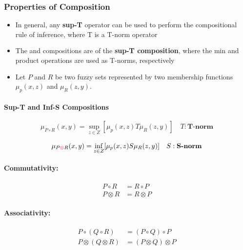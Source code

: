 \documentclass{tron}
\begin{document}
\subsubsection{Properties of Composition}
\begin{itemize}
	\item In general, any \textbf{sup-T} operator can be used to perform the compositional rule of inference, where T is a T-norm operator
	\item The  and  compositions are  of the \textbf{sup-T composition}, where the min and product operations are used as T-norms, respectively
	\item Let $P$ and $R$ be two fuzzy sets represented by two membership functions $\mu_p(x,z)$ and $\mu_R(z,y)$. 
\end{itemize}
\paragraph{Sup-T and Inf-S Compositions}
\begin{definition}{}
	\begin{equation}
		\mu_{P \circ R}(x,y) = \underset{z\in Z}{\sup} [\mu_p (x,z) T \mu_R(z,y)] \quad T: \textbf{T-norm}
	\end{equation}
\end{definition}
\begin{definition}{}
	\begin{equation}
		\mu_{P \textcolor{red}{\otimes} R}(x,y) = \underset{z\in Z}{\inf} [\mu_p (x,z) S \mu_R(z,y)] \quad S: \textbf{S-norm}
	\end{equation}
\end{definition}
\paragraph{Commutativity:}
\begin{align}
	P \circ R &= R \circ P \\
	P \otimes R &= R \otimes P
\end{align}
\paragraph{Associativity:}
\begin{align}
	P \circ (Q \circ R) & = (P \circ Q) \circ P \\
	P \otimes (Q \otimes R) & = (P \otimes Q) \otimes P
\end{align}
\end{document}
